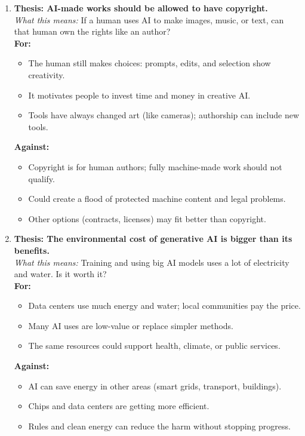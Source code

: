 \documentclass[12pt]{article}
\begin{document}
\begin{enumerate}
\item \textbf{Thesis: AI-made works should be allowed to have copyright.}\\
\emph{What this means:} If a human uses AI to make images, music, or text, can that human own the rights like an author?\\
\textbf{For:}
\begin{itemize}
\item The human still makes choices: prompts, edits, and selection show creativity.
\item It motivates people to invest time and money in creative AI.
\item Tools have always changed art (like cameras); authorship can include new tools.
\end{itemize}
\textbf{Against:}
\begin{itemize}
\item Copyright is for human authors; fully machine-made work should not qualify.
\item Could create a flood of protected machine content and legal problems.
\item Other options (contracts, licenses) may fit better than copyright.
\end{itemize}


\item \textbf{Thesis: The environmental cost of generative AI is bigger than its benefits.}\\
\emph{What this means:} Training and using big AI models uses a lot of electricity and water. Is it worth it?\\
\textbf{For:}
\begin{itemize}
    \item Data centers use much energy and water; local communities pay the price.
    \item Many AI uses are low-value or replace simpler methods.
    \item The same resources could support health, climate, or public services.
\end{itemize}
\textbf{Against:}
\begin{itemize}
    \item AI can save energy in other areas (smart grids, transport, buildings).
    \item Chips and data centers are getting more efficient.
    \item Rules and clean energy can reduce the harm without stopping progress.
\end{itemize}


\end{enumerate}
\end{document}
